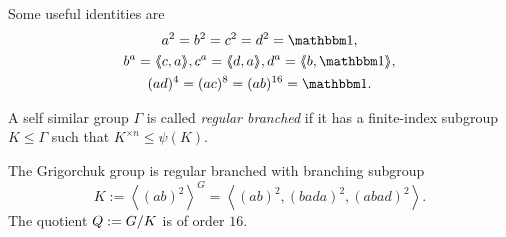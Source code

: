 \documentclass[a4paper,11pt]{amsart}
\begin{document}
Some useful identities are
\begin{gather*}
  a^2=b^2=c^2=d^2=\id,\\
  b^a= \pair{c,a}, c^a=\pair{d,a}, d^a=\pair{b,\id},\\
  (ad)^4=(ac)^8=(ab)^{16}= \id.
\end{gather*}
\begin{defi}
 A self similar group $\Gamma$ is called \emph{regular branched} if it
 has a finite-index subgroup $K\leq \Gamma$ such that $K^{\times n} \leq \psi(K)$.
\end{defi}
\begin{lem}\label{lem:subgroupK}
The Grigorchuk group is regular branched with branching subgroup 
 \[K:= \left<(ab)^2\right>^G=\left< (ab)^2,(bada)^2,(abad)^2 \right>. \]
 The quotient $Q := {G/K}$ is of order $16$.
\end{lem}
\end{document}
